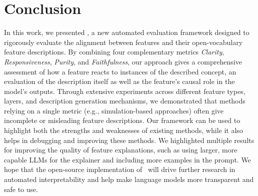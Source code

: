 \section{Conclusion}

In this work, we presented \ours, a new automated evaluation framework designed to rigorously evaluate the alignment between features and their open-vocabulary feature descriptions. By combining four complementary metrics \textit{Clarity}, \textit{Responsiveness}, \textit{Purity}, and \textit{Faithfulness}, our approach gives a comprehensive assessment of how a feature reacts to instances of the described concept, an evaluation of the description itself as well as the feature's causal role in the model’s outputs. Through extensive experiments across different feature types, layers, and description generation mechanisms, we demonstrated that methods relying on a single metric (e.g., simulation-based approaches) often give incomplete or misleading feature descriptions. Our framework can be used to highlight both the strengths and weaknesses of existing methods, while it also helps in debugging and improving these methods. We highlighted multiple results for improving the quality of feature explanations, such as using larger, more capable LLMs for the explainer and including more examples in the prompt. We hope that the open-source implementation of \ours\ will drive further research in automated interpretability and help make language models more transparent and safe to use.